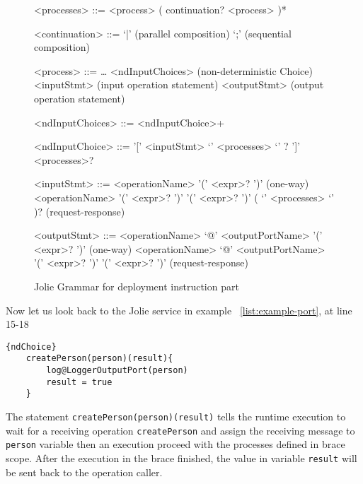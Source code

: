 \begin{figure}[h]
    \begin{framed}
        \begin{grammar}
            <processes>
            ::= <process> ( continuation? <process> )*

            <continuation> ::= `|' \hfill (parallel composition)
            \alt `;' \hfill (sequential composition)

            <process> ::= \dots
            \alt <ndInputChoices> \hfill (non-deterministic Choice)
            \alt <inputStmt> \hfill (input operation statement)
            \alt <outputStmt> \hfill (output operation statement)

            <ndInputChoices>
            ::= <ndInputChoice>+

            <ndInputChoice>
            ::= '[' <inputStmt> `{' <processes> `}' ? ']' <processes>?

            <inputStmt>
            ::= <operationName> '(' <expr>? ')' \hfill (one-way)
            \alt
            <operationName> '(' <expr>? ')' '(' <expr>? ')' ( `{' <processes> `}' )? \hfill (request-response)

            <outputStmt>
            ::= <operationName> `@' <outputPortName> '(' <expr>? ')' \hfill (one-way)
            \alt
            <operationName> `@' <outputPortName> '(' <expr>? ')' '(' <expr>? ')' \hfill (request-response)
        \end{grammar}
    \end{framed}
    \caption{Jolie Grammar for deployment instruction part}
    \label{fig:jolie-process}
\end{figure}

Now let us look back to the Jolie service in example ~\ref{list:example-port}, at line 15-18

\begin{lstlisting}{ndChoice}
    createPerson(person)(result){
        log@LoggerOutputPort(person)
        result = true
    }
\end{lstlisting}

The statement \texttt{createPerson(person)(result)} tells the runtime execution to wait for a receiving operation \texttt{createPerson} and assign the receiving message to \texttt{person} variable then an execution proceed with the processes defined in brace scope. After the execution in the brace finished, the value in variable \texttt{result} will be sent back to the operation caller.


